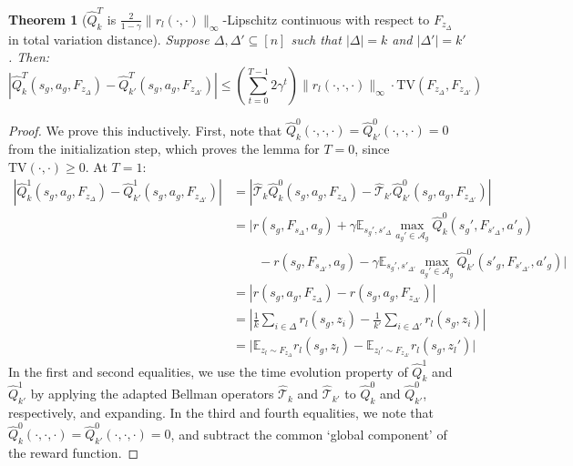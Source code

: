 \documentclass{article}
\theoremstyle{plain}
\newtheorem{theorem}{Theorem}[section]
\theoremstyle{definition}
\def\E{\mathbb{E}}
\begin{document}
\begin{theorem}[$\hat{Q}_k^T$ is $\frac{2}{1-\gamma}\|r_l(\cdot,\cdot)\|_\infty$-Lipschitz continuous with respect to $F_{z_\Delta}$ in total variation distance]
Suppose $\Delta,\Delta'\subseteq[n]$ such that $|\Delta|=k$ and $|\Delta'|=k'$. Then:
\[\left|\hat{Q}^T_k(s_g,a_g, F_{z_\Delta}) - \hat{Q}^T_{k'}(s_g, a_g, F_{z_{\Delta'}})\right| \leq \left(\sum_{t=0}^{T-1} 2\gamma^t\right)\|r_l(\cdot,\cdot,\cdot)\|_\infty \cdot \mathrm{TV}\left(F_{z_\Delta}, F_{z_{\Delta'}}\right)
    \]
    \label{lemma: Q lipschitz continuous wrt Fsdelta}
\end{theorem}
\begin{proof} 
\noindent We prove this inductively. First, note that $\hat{Q}_k^0(\cdot,\cdot,\cdot) = \hat{Q}_{k'}^0(\cdot,\cdot,\cdot)=0$ from the initialization step, which proves the lemma for $T=0$, since $\mathrm{TV}(\cdot,\cdot)\geq 0$. At $T=1$:
\begin{align*}
|\hat{Q}_k^1(s_g,a_g,F_{z_\Delta})-\hat{Q}_{k'}^1(s_g,a_g,F_{z_{\Delta'}})| &= \left|\hat{\mathcal{T}}_k\hat{Q}_k^0(s_g,a_g,F_{z_\Delta})-\hat{\mathcal{T}}_{k'}\hat{Q}_{k'}^0(s_g,a_g, F_{z_{\Delta'}})\right| \\
&= \bigg|r(s_g, F_{s_\Delta}, a_g)+\gamma \E_{s_g', s'_\Delta}\max_{a_g'\in\mathcal{A}_g} \hat{Q}_k^0(s_g',F_{s'_\Delta},a'_g) \\
&\quad\quad-r(s_g,F_{s_{\Delta'}},a_g) -\gamma \E_{s_g', s'_{\Delta'}} \max_{a_g'\in\mathcal{A}_g}\hat{Q}_{k'}^0(s'_g, F_{s'_{\Delta'}}, a'_g)\bigg| \\
&= |r(s_g, a_g, F_{z_\Delta})-r(s_g, a_g, F_{z_{\Delta'}})| \\
&= \left|\frac{1}{k}\sum_{i\in\Delta}r_l(s_g,z_i) -\frac{1}{k'}\sum_{i\in\Delta'}r_l(s_g,z_i)\right| \\
&= \bigg|\E_{z_l \sim F_{z_\Delta}}r_l(s_g, z_l) - \E_{z_l' \sim F_{z_{\Delta'}}}r_l(s_g, z_l')\bigg|
\end{align*}
In the first and second equalities, we use the time evolution property of $\hat{Q}_k^1$ and $\hat{Q}_{k'}^1$ by applying the adapted Bellman operators $\hat{\mathcal{T}}_k$ and $\hat{\mathcal{T}}_{k'}$ to $\hat{Q}_k^0$ and $\hat{Q}_{k'}^0$, respectively, and expanding. In the third and fourth equalities, we note that $\hat{Q}_k^0(\cdot,\cdot,\cdot)=\hat{Q}_{k'}^0(\cdot,\cdot,\cdot)=0$, and subtract the common `global component' of the reward function. 


\end{proof}
\end{document}
